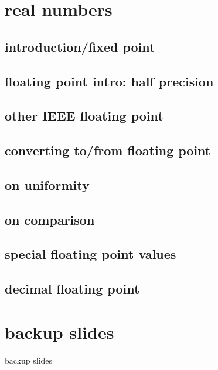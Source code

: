 


\section{real numbers}

\subsection{introduction/fixed point}


\subsection{floating point intro: half precision}


%
\subsection{other IEEE floating point}


\subsection{converting to/from floating point}




\subsection{on uniformity}


\subsection{on comparison}




\subsection{special floating point values}


\subsection{decimal floating point}


\section{backup slides}
\begin{frame}{backup slides}
\end{frame}






